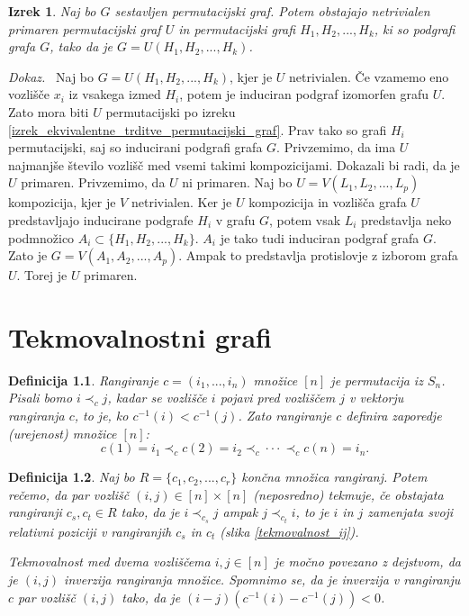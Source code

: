 \documentclass[a4paper, 12pt]{book}
\newtheorem{definicija}{Definicija}[chapter]
\newtheorem{izrek}{Izrek}[chapter]
\newenvironment{dokaz}{\emph{Dokaz.}\ }{\hspace{\fill}{$\Box$}}
\begin{document}
\begin{izrek}
    Naj bo $G$ sestavljen permutacijski graf. Potem obstajajo netrivialen primaren permutacijski graf $U$ in permutacijski grafi $H_1, H_2, ..., H_k$, ki so podgrafi grafa $G$, tako da je $G = U(H_1, H_2, ..., H_k)$.
\end{izrek}
\begin{dokaz}
    Naj bo $G = U(H_1, H_2, ..., H_k)$, kjer je $U$ netrivialen. Če vzamemo eno vozlišče $x_i$ iz vsakega izmed $H_i$, potem je induciran podgraf izomorfen grafu $U$. Zato mora biti $U$ permutacijski po izreku \ref{izrek_ekvivalentne_trditve_permutacijski_graf}. Prav tako so grafi $H_i$ permutacijski, saj so inducirani podgrafi grafa $G$. Privzemimo, da ima $U$ najmanjše število vozlišč med vsemi takimi kompozicijami. Dokazali bi radi, da je $U$ primaren. Privzemimo, da $U$ ni primaren. Naj bo $U = V(L_1, L_2, ..., L_p)$ kompozicija, kjer je $V$ netrivialen. Ker je $U$ kompozicija in vozlišča grafa $U$ predstavljajo inducirane podgrafe $H_i$ v grafu $G$, potem vsak $L_i$ predstavlja neko podmnožico $A_i \subset \{ H_1, H_2, ..., H_k \}$. $A_i$ je tako tudi induciran podgraf grafa $G$. Zato je $G = V(A_1, A_2, ..., A_p)$. Ampak to predstavlja protislovje z izborom grafa $U$. Torej je $U$ primaren.
\end{dokaz}

\chapter{ Tekmovalnostni grafi }

\begin{definicija}
    Rangiranje $c = (i_1, ..., i_n)$ množice $[n]$ je permutacija iz $S_n$. Pisali bomo $i \prec_c j$, kadar se vozlišče $i$ pojavi pred vozliščem $j$ v vektorju rangiranja $c$, to je, ko $c^{-1}(i) < c^{-1}(j)$. Zato rangiranje $c$ definira zaporedje (urejenost) množice $[n]$:
    \[
        c(1) = i_1 \prec_c c(2) = i_2 \prec_c \cdot\cdot\cdot \prec_c c(n) = i_n.
    \]
\end{definicija}

\begin{definicija}
\label{def_tekmovalnosti}
    Naj bo $R = \{c_1, c_2, ..., c_r\}$ končna množica rangiranj. Potem rečemo, da par vozlišč $(i, j) \in [n] \times [n]$ (neposredno) tekmuje, če obstajata rangiranji $c_s, c_t \in R$ tako, da je $i \prec_{c_s} j$ ampak $j \prec_{c_t} i$, to je $i$ in $j$ zamenjata svoji relativni poziciji v rangiranjih $c_s$ in $c_t$ (slika \ref{tekmovalnost_ij}).

    Tekmovalnost med dvema vozliščema $i, j \in [n]$ je močno povezano z dejstvom, da je $(i, j)$ inverzija rangiranja množice. Spomnimo se, da je inverzija v rangiranju $c$ par vozlišč $(i, j)$ tako, da je $(i-j)(c^{-1}(i) - c^{-1}(j)) < 0$.
\end{definicija}
\end{document}
